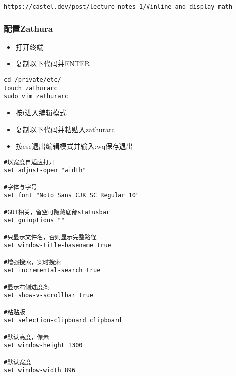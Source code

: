 \documentclass[UTF_8]{ctexart}
\begin{document}
\small
\heiti
{}
\begin{lstlisting}[frame=shadowbox]
https://castel.dev/post/lecture-notes-1/#inline-and-display-math
\end{lstlisting}


\clearpage
\subsubsection{配置Zathura}
\small
\heiti
{}
\begin{itemize}
		\item 打开终端
		\item 复制以下代码并ENTER
		
\end{itemize}

\begin{lstlisting}[frame=shadowbox]
cd /private/etc/
touch zathurarc
sudo vim zathurarc
\end{lstlisting}
\begin{itemize}
		\item 按i进入编辑模式
		\item 复制以下代码并粘贴入zathurarc
		\item 按esc退出编辑模式并输入:wq保存退出
		
\end{itemize}
\begin{lstlisting}[frame=shadowbox]
#以宽度自适应打开
set adjust-open "width"

#字体与字号
set font "Noto Sans CJK SC Regular 10"

#GUI相关，留空可隐藏底部statusbar
set guioptions ""

#只显示文件名，否则显示完整路径
set window-title-basename true

#增强搜索，实时搜索
set incremental-search true

#显示右侧进度条
set show-v-scrollbar true

#粘贴版
set selection-clipboard clipboard

#默认高度，像素
set window-height 1300

#默认宽度
set window-width 896
\end{lstlisting}

\small
\heiti
{}
\small
\heiti
{}
\end{document}
